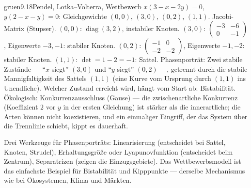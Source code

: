 \begin{loesungkarte}{gruen}{9.18}{Pendel, Lotka--Volterra, Wettbewerb}
$x(3 - x - 2y) = 0$, $y(2 - x - y) = 0$: Gleichgewichte $(0, 0)$, $(3, 0)$, $(0, 2)$, $(1, 1)$. Jacobi-Matrix (Stupser). $(0, 0)$: $\operatorname{diag}(3, 2)$, instabiler Knoten. $(3, 0)$: $\begin{pmatrix}-3&-6\\0&-1\end{pmatrix}$, Eigenwerte $-3, -1$: stabiler Knoten. $(0, 2)$: $\begin{pmatrix}-1&0\\-2&-2\end{pmatrix}$, Eigenwerte $-1, -2$: stabiler Knoten. $(1, 1)$: $\det = 1 - 2 = -1$: Sattel. Phasenporträt: Zwei stabile Zustände --- \enquote{$x$ siegt} $(3, 0)$ und \enquote{$y$ siegt} $(0, 2)$ ---, getrennt durch die stabile Mannigfaltigkeit des Sattels $(1, 1)$ (eine Kurve vom Ursprung durch $(1, 1)$ ins Unendliche). Welcher Zustand erreicht wird, hängt vom Start ab: Bistabilität. Ökologisch: Konkurrenzausschluss (Gause) --- die zwischenartliche Konkurrenz (Koeffizient $2$ vor $y$ in der ersten Gleichung) ist stärker als die innerartliche; die Arten können nicht koexistieren, und ein einmaliger Eingriff, der das System über die Trennlinie schiebt, kippt es dauerhaft.
\begin{mitnehmen}\kastentext
Drei Werkzeuge für Phasenporträts: Linearisierung (entscheidet bei Sattel, Knoten, Strudel), Erhaltungsgröße oder Lyapunovfunktion (entscheidet beim Zentrum), Separatrizen (zeigen die Einzugsgebiete). Das Wettbewerbsmodell ist das einfachste Beispiel für Bistabilität und Kipppunkte --- derselbe Mechanismus wie bei Ökosystemen, Klima und Märkten.
\end{mitnehmen}
\end{loesungkarte}


